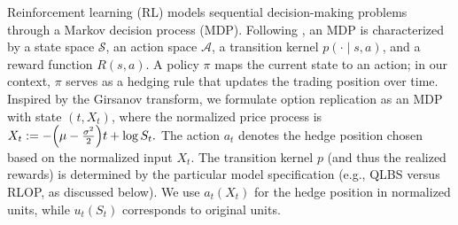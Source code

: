 
Reinforcement learning (RL) models sequential decision-making problems through a Markov decision process (MDP).
Following \cite{sutton2018reinforcement}, an MDP is characterized by a state space $\mathcal S$, an action space $\mathcal A$, a transition kernel $p(\cdot \mid s,a)$, and a reward function $R(s,a)$.
A policy $\pi$ maps the current state to an action; in our context, $\pi$ serves as a hedging rule that updates the trading position over time.
Inspired by the Girsanov transform, we formulate option replication as an MDP with state $(t,X_t)$, where the normalized price process is
$
X_t := -\Bigl(\mu - \tfrac{\sigma^2}{2}\Bigr)t + \log S_t .
$
The action $a_t$ denotes the hedge position chosen based on the normalized input $X_t$.
The transition kernel $p$ (and thus the realized rewards) is determined by the particular model specification (e.g., QLBS versus RLOP, as discussed below).
We use $a_t(X_t)$ for the hedge position in normalized units, while $u_t(S_t)$ corresponds to original units.






